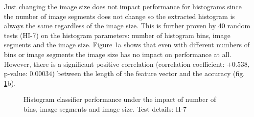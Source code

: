 	Just changing the image size does not impact performance for histograms since the number of image segments does not change so the extracted histogram is always the same regardless of the image size. This is further proven by 40 random tests {(HI-7)} on the histogram parameters: number of histogram bins, image segments and the image size. Figure \ref{fig:resultsResolutionHistogram}a shows that even with different numbers of bins or image segments the image size has no impact on performance at all. However, there is a significant positive correlation {(correlation coefficient: $+0.538$, p-value: $0.00034$)} between the length of the feature vector and the accuracy {(fig. \ref{fig:resultsResolutionHistogram}b)}.
	
	\begin{figure}[htb]
		\centering
		\caption{Histogram classifier performance under the impact of number of bins, image segments and image size. Test details: H-7}
		\label{fig:resultsResolutionHistogram}
	\end{figure}
			
